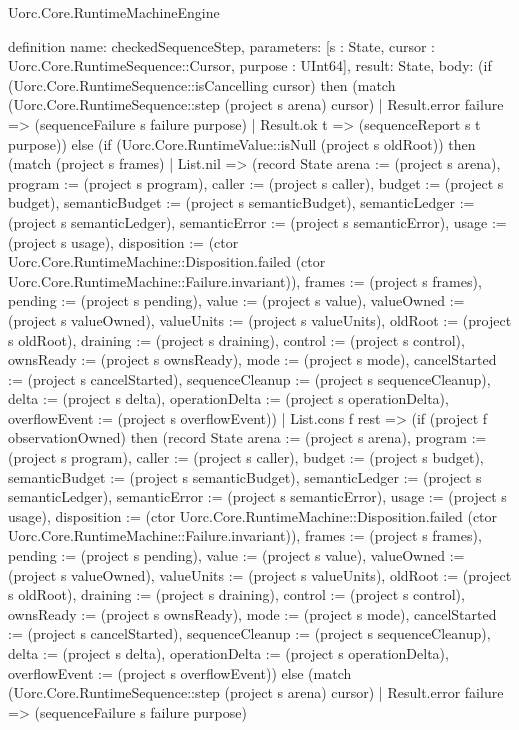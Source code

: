 \begin{lexlean}{Uorc.Core.RuntimeMachineEngine}
\begin{semanticmodule}
definition{
  name: checkedSequenceStep,
  parameters: [s : State, cursor : Uorc.Core.RuntimeSequence::Cursor, purpose : UInt64],
  result: State,
  body: (if (Uorc.Core.RuntimeSequence::isCancelling cursor) then (match (Uorc.Core.RuntimeSequence::step (project s arena) cursor)
    | Result.error failure => (sequenceFailure s failure purpose)
    | Result.ok t => (sequenceReport s t purpose)) else (if (Uorc.Core.RuntimeValue::isNull (project s oldRoot)) then (match (project s frames)
    | List.nil => (record State {arena := (project s arena), program := (project s program), caller := (project s caller), budget := (project s budget), semanticBudget := (project s semanticBudget), semanticLedger := (project s semanticLedger), semanticError := (project s semanticError), usage := (project s usage), disposition := (ctor Uorc.Core.RuntimeMachine::Disposition.failed (ctor Uorc.Core.RuntimeMachine::Failure.invariant)), frames := (project s frames), pending := (project s pending), value := (project s value), valueOwned := (project s valueOwned), valueUnits := (project s valueUnits), oldRoot := (project s oldRoot), draining := (project s draining), control := (project s control), ownsReady := (project s ownsReady), mode := (project s mode), cancelStarted := (project s cancelStarted), sequenceCleanup := (project s sequenceCleanup), delta := (project s delta), operationDelta := (project s operationDelta), overflowEvent := (project s overflowEvent)})
    | List.cons f rest => (if (project f observationOwned) then (record State {arena := (project s arena), program := (project s program), caller := (project s caller), budget := (project s budget), semanticBudget := (project s semanticBudget), semanticLedger := (project s semanticLedger), semanticError := (project s semanticError), usage := (project s usage), disposition := (ctor Uorc.Core.RuntimeMachine::Disposition.failed (ctor Uorc.Core.RuntimeMachine::Failure.invariant)), frames := (project s frames), pending := (project s pending), value := (project s value), valueOwned := (project s valueOwned), valueUnits := (project s valueUnits), oldRoot := (project s oldRoot), draining := (project s draining), control := (project s control), ownsReady := (project s ownsReady), mode := (project s mode), cancelStarted := (project s cancelStarted), sequenceCleanup := (project s sequenceCleanup), delta := (project s delta), operationDelta := (project s operationDelta), overflowEvent := (project s overflowEvent)}) else (match (Uorc.Core.RuntimeSequence::step (project s arena) cursor)
      | Result.error failure => (sequenceFailure s failure purpose)
}
\end{semanticmodule}
\end{lexlean}
